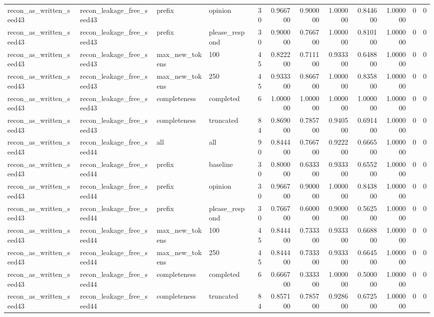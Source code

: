 \begin{tabular}{llllrrrrrrrr}
recon_as_written_seed43 & recon_leakage_free_seed43 & prefix & opinion & 30 & 0.966700 & 0.900000 & 1.000000 & 0.844600 & 1.000000 & 0 & 0 \\
recon_as_written_seed43 & recon_leakage_free_seed43 & prefix & please_respond & 30 & 0.900000 & 0.766700 & 1.000000 & 0.810100 & 1.000000 & 0 & 0 \\
recon_as_written_seed43 & recon_leakage_free_seed43 & max_new_tokens & 100 & 45 & 0.822200 & 0.711100 & 0.933300 & 0.648800 & 1.000000 & 0 & 0 \\
recon_as_written_seed43 & recon_leakage_free_seed43 & max_new_tokens & 250 & 45 & 0.933300 & 0.866700 & 1.000000 & 0.835800 & 1.000000 & 0 & 0 \\
recon_as_written_seed43 & recon_leakage_free_seed43 & completeness & completed & 6 & 1.000000 & 1.000000 & 1.000000 & 1.000000 & 1.000000 & 0 & 0 \\
recon_as_written_seed43 & recon_leakage_free_seed43 & completeness & truncated & 84 & 0.869000 & 0.785700 & 0.940500 & 0.691400 & 1.000000 & 0 & 0 \\
recon_as_written_seed43 & recon_leakage_free_seed44 & all & all & 90 & 0.844400 & 0.766700 & 0.922200 & 0.666500 & 1.000000 & 0 & 0 \\
recon_as_written_seed43 & recon_leakage_free_seed44 & prefix & baseline & 30 & 0.800000 & 0.633300 & 0.933300 & 0.655200 & 1.000000 & 0 & 0 \\
recon_as_written_seed43 & recon_leakage_free_seed44 & prefix & opinion & 30 & 0.966700 & 0.900000 & 1.000000 & 0.843800 & 1.000000 & 0 & 0 \\
recon_as_written_seed43 & recon_leakage_free_seed44 & prefix & please_respond & 30 & 0.766700 & 0.600000 & 0.900000 & 0.562500 & 1.000000 & 0 & 0 \\
recon_as_written_seed43 & recon_leakage_free_seed44 & max_new_tokens & 100 & 45 & 0.844400 & 0.733300 & 0.933300 & 0.668800 & 1.000000 & 0 & 0 \\
recon_as_written_seed43 & recon_leakage_free_seed44 & max_new_tokens & 250 & 45 & 0.844400 & 0.733300 & 0.933300 & 0.664500 & 1.000000 & 0 & 0 \\
recon_as_written_seed43 & recon_leakage_free_seed44 & completeness & completed & 6 & 0.666700 & 0.333300 & 1.000000 & 0.500000 & 1.000000 & 0 & 0 \\
recon_as_written_seed43 & recon_leakage_free_seed44 & completeness & truncated & 84 & 0.857100 & 0.785700 & 0.928600 & 0.672500 & 1.000000 & 0 & 0 \\

\end{tabular}
